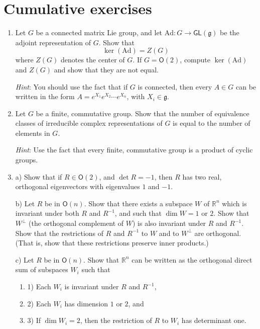 \documentclass{amsbook}
\let \frak = \mathfrak
\theoremstyle{plain}
\numberwithin{equation}{chapter}
\numberwithin{theorem}{chapter}
\begin{document}
\chapter{Cumulative exercises}

\begin{enumerate}
\item  Let $G$ be a connected matrix Lie group, and let $\mathrm{Ad}%
:G\rightarrow\mathsf{GL}(\frak{g})$ be the adjoint representation of $G$. Show
that
\[
\ker(\mathrm{Ad})=Z(G)
\]
where $Z(G)$ denotes the center of $G$. If $G=\mathsf{O}(2)$, compute
$\ker(\mathrm{Ad})$ and $Z(G)$ and show that they are not equal.

\textit{Hint}: You should use the fact that if $G$ is connected, then every
$A\in G$ can be written in the form $A=e^{X_{1}}e^{X_{2}}\cdots e^{X_{n}}$,
with $X_{i}\in\frak{g}$.

\item  Let $G$ be a finite, commutative group. Show that the number of
equivalence classes of irreducible complex representations of $G$ is equal to
the number of elements in $G$.

\textit{Hint}: Use the fact that every finite, commutative group is a product
of cyclic groups.

\item  a) Show that if $R\in\mathsf{O}(2)$, and $\det R=-1$, then $R$ has two
real, orthogonal eigenvectors with eigenvalues $1$ and $-1$.

b) Let $R$ be in $\mathsf{O}(n)$. Show that there exists a subspace $W$ of
$\mathbb{R}^{n}$ which is invariant under both $R$ and $R^{-1}$, and such that
$\dim W=1$ or $2$. Show that $W^{\perp}$ (the orthogonal complement of $W$) is
also invariant under $R$ and $R^{-1}$. Show that the restrictions of $R$ and
$R^{-1}$ to $W$ and to $W^{\perp}$ are orthogonal. (That is, show that these
restrictions preserve inner products.)

c) Let $R$ be in $\mathsf{O}(n)$. Show that $\mathbb{R}^{n}$ can be written as
the orthogonal direct sum of subspaces $W_{i}$ such that

\begin{enumerate}
\item 1) Each $W_{i}$ is invariant under $R$ and $R^{-1}$,

\item 2) Each $W_{i}$ has dimension $1$ or $2$, and

\item 3) If $\dim W_{i}=2$, then the restriction of $R$ to $W_{i}$ has
determinant one.
\end{enumerate}


\end{enumerate}
\end{document}
